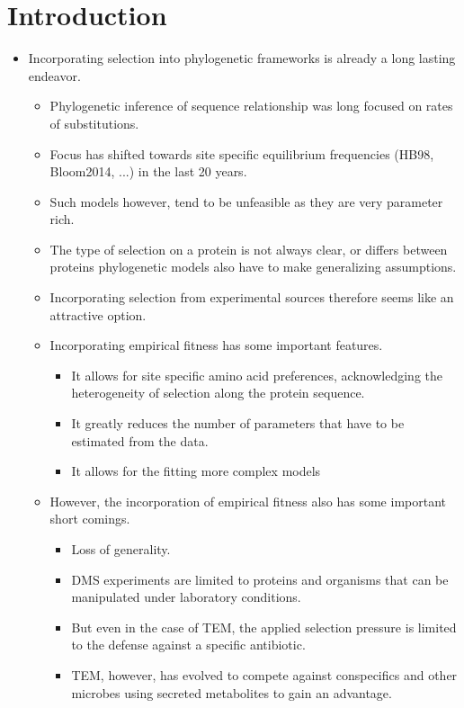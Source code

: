 \documentclass[12pt]{article}
\begin{document}
\section*{Introduction}
\begin{itemize}

	\item Incorporating selection into phylogenetic frameworks is already a long lasting endeavor.
	\begin{itemize}
		\item Phylogenetic inference of sequence relationship was long focused on rates of substitutions.
		\item Focus has shifted towards site specific equilibrium frequencies (HB98, Bloom2014, ...) in the last 20 years.
		\item Such models however, tend to be unfeasible as they are very parameter rich.
		\item The type of selection on a protein is not always clear, or differs between proteins phylogenetic models also have to make generalizing assumptions.
		\item Incorporating selection from experimental sources therefore seems like an attractive option.
		\item Incorporating empirical fitness has some important features.
		\begin{itemize}
			\item It allows for site specific amino acid preferences, acknowledging the heterogeneity of selection along the protein sequence.
			\item It greatly reduces the number of parameters that have to be estimated from the data.
			\item It allows for the fitting more complex models
		\end{itemize}
		\item However, the incorporation of empirical fitness also has some important short comings.
		\begin{itemize}
			\item Loss of generality.
			\item DMS experiments are limited to proteins and organisms that can be manipulated under laboratory conditions.
			\item But even in the case of TEM, the applied selection pressure is limited to the defense against a specific antibiotic.
			\item TEM, however, has evolved to compete against conspecifics and other microbes using secreted metabolites to gain an advantage.

\end{itemize}
\end{itemize}
\end{itemize}
\end{document}
